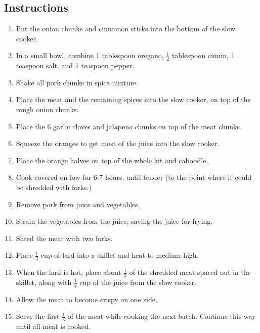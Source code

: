 \begin{multicols}{2}
\subsection*{Instructions}
\begin{enumerate}
    \item Put the onion chunks and cinnamon sticks into the bottom of the slow cooker.
    \item In a small bowl, combine 1 tablespoon oregano, \( \frac{1}{2} \) tablespoon cumin, 1 teaspoon salt, and 1 teaspoon pepper.
    \item Shake all pork chunks in spice mixture.
    \item Place the meat and the remaining spices into the slow cooker, on top of the rough onion chunks.
    \item Place the 6 garlic cloves and jalapeno chunks on top of the meat chunks.
    \item Squeeze the oranges to get most of the juice into the slow cooker.
    \item Place the orange halves on top of the whole kit and caboodle.
    \item Cook covered on low for 6-7 hours, until tender (to the point where it could be shredded with forks.)
    \item Remove pork from juice and vegetables.
    \item Strain the vegetables from the juice, saving the juice for frying.
    \item Shred the meat with two forks.
    \item Place \( \frac{1}{3} \) cup of lard into a skillet and heat to medium-high.
    \item When the lard is hot, place about \( \frac{1}{3} \) of the shredded meat spaced out in the skillet, along with \( \frac{1}{4} \) cup of the juice from the slow cooker.
    \item Allow the meat to become crispy on one side.
    \item Serve the first \( \frac{1}{3} \) of the meat while cooking the next batch. Continue this way until all meat is cooked.

\end{enumerate}


\end{multicols}
